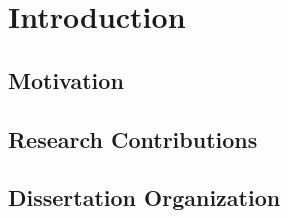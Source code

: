 \chapter{Introduction\label{ch:Introduction}}


\renewcommand{\SectionsDir}{Chapter1/Sections}
\renewcommand{\SubsectionsDir}{Chapter1/Sections/Subsections}
\renewcommand{\FigsDir}{Chapter1/Figs}
\renewcommand{\TablesDir}{Chapter1/Tables}


\section{Motivation}


\section{Research Contributions}


\section{Dissertation Organization}

